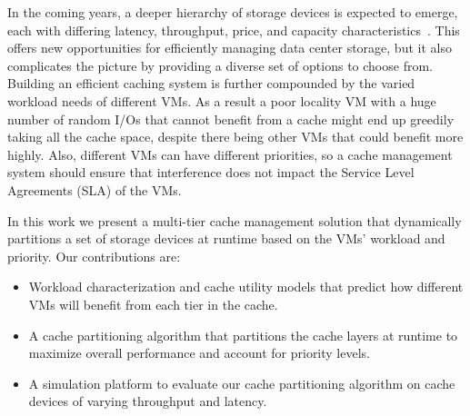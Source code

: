 In the coming years, a deeper hierarchy of storage devices is expected to emerge, each with differing latency, throughput, price, and capacity characteristics~\cite{storage-hierarchy}. This offers new opportunities for efficiently managing data center storage, but it also complicates the picture by providing a diverse set of options to choose from. Building an efficient caching system is further compounded by the varied workload needs of different VMs. As a result a poor locality VM with a huge number of random I/Os that cannot benefit from a cache might end up greedily taking all the cache space, despite there being other VMs that could benefit more highly. Also, different VMs can have different priorities, so a cache management system should ensure that interference does not impact the Service Level Agreements (SLA) of the VMs.


In this work we present a multi-tier cache management solution that dynamically partitions a set of storage devices at runtime based on the VMs' workload and priority. Our contributions are:
\begin{itemize}
\item Workload characterization and cache utility models that predict how different VMs will benefit from each tier in the cache.
\item A cache partitioning algorithm that partitions the cache layers at runtime to maximize overall performance and account for priority levels.
\item A simulation platform to evaluate our cache partitioning algorithm on cache devices of varying throughput and latency.
\end{itemize}
